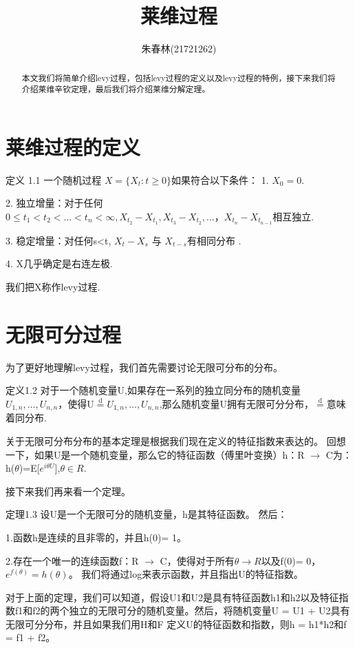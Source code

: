 \documentclass{ctexart} %
\title{莱维过程}
\author{朱春林(21721262)}
\begin{document}
\maketitle

\begin{abstract}
本文我们将简单介绍levy过程，包括levy过程的定义以及levy过程的特例，接下来我们将介绍莱维辛钦定理，最后我们将介绍莱维分解定理。
\end{abstract}

\section{莱维过程的定义}
定义 1.1 一个随机过程 ${X=\{X_{t}:t\geq 0\}}$如果符合以下条件： 
    1. $X_{0}=0$.
    
    2. 独立增量：对于任何$0\leq t_{1} < t_{2} < \dots < t_{n} < \infty ,X_{t_2}-X_{t_1},X_{t_3}-X_{t_2},\dots，X_{t_n}-X_{t_{n-1}}$相互独立.
    
    3. 稳定增量：对任何s<t, $X_{t}-X_{s}$ 与 $X_{t-s}$有相同分布 .  
    
    4. X几乎确定是右连左极.
    
我们把X称作levy过程.

\section{无限可分过程}
为了更好地理解levy过程，我们首先需要讨论无限可分布的分布。

定义1.2 对于一个随机变量U,如果存在一系列的独立同分布的随机变量$U_{1,n},\dots,U_{n,n}$，使得U$\overset{\text{d}}{=}U_{1,n},\dots,U_{n,n}$,那么随机变量U拥有无限可分分布，$\overset{\text{d}}{=}$意味着同分布.

关于无限可分布分布的基本定理是根据我们现在定义的特征指数来表达的。 回想一下，如果U是一个随机变量，那么它的特征函数（傅里叶变换）h：R $\to$ C为：h($\theta$)=E[$e^{i\theta U}$],$\theta \in R$.

接下来我们再来看一个定理。

定理1.3 设U是一个无限可分的随机变量，h是其特征函数。 然后：

1.函数h是连续的且非零的，并且h(0)= 1。

2.存在一个唯一的连续函数f：R $\to$ C，使得对于所有$\theta \to R $以及f(0)= 0，$e^{f(\theta)}= h(\theta)$。 我们将通过log来表示函数，并且指出U的特征指数。

对于上面的定理，我们可以知道，假设U1和U2是具有特征函数h1和h2以及特征指数f1和f2的两个独立的无限可分的随机变量。然后，将随机变量U = U1 + U2具有无限可分分布，并且如果我们用H和F 定义U的特征函数和指数，则h = h1*h2和f = f1 + f2。
\end{document}
